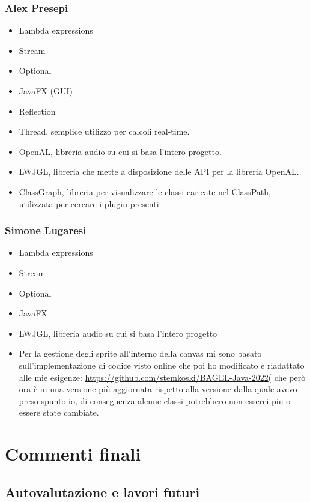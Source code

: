 \documentclass[a4paper,12pt]{report}
\begin{document}
\subsection*{Alex Presepi}
\begin{itemize}
	\item Lambda expressions
	\item Stream
	\item Optional
	\item JavaFX (GUI)
	\item Reflection
	\item Thread, semplice utilizzo per calcoli real-time.
	\item OpenAL,  libreria audio su cui si basa l’intero progetto.
	\item LWJGL, libreria che mette a disposizione delle API per la libreria OpenAL.
	\item ClassGraph, libreria per visualizzare le classi caricate nel ClassPath, utilizzata per cercare i plugin presenti.
\end{itemize}
\subsection*{Simone Lugaresi}
\begin{itemize}
	\item Lambda expressions
	\item Stream
	\item Optional
	\item JavaFX
	\item LWJGL, libreria audio su cui si basa l’intero progetto
	\item Per la gestione degli sprite all'interno della canvas mi sono basato sull'implementazione di codice visto online che poi ho modificato e riadattato alle mie esigenze: \url{https://github.com/stemkoski/BAGEL-Java-2022}( che però ora è in una versione più aggiornata rispetto alla versione dalla quale avevo preso spunto io, di conseguenza alcune classi potrebbero non esserci piu o essere state cambiate.
\end{itemize}

\chapter{Commenti finali}
\section{Autovalutazione e lavori futuri}
\end{document}
